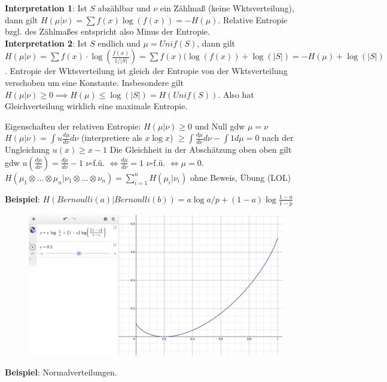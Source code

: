 \begin{outline}
    \1 \textbf{Interpretation 1}: Ist $S$ abzählbar und $\nu$ ein Zählmaß (keine Wktsverteilung), dann gilt $H(\mu|\nu)=\sum f(x)\log(f(x))=-H(\mu)$. Relative Entropie bzgl. des Zählmaßes entspricht also Minus der Entropie. \\

    \1 \textbf{Interpretation 2}: Ist $S$ endlich und $\mu=Unif(S)$, dann gilt $H(\mu|\nu)=\sum f(x) \cdot \log(\frac{f(x)}{1/|S|})=\sum f(x)(\log(f(x))+\log(|S|)=-H(\mu)+\log(|S|)$. Entropie der Wktsverteilung ist gleich der Entropie von der Wktsverteilung verschoben um eine Konstante. Insbesondere gilt $H(\mu |\nu)\geq 0 \implies H(\mu)\leq \log(|S|) = H(Unif(S))$. Also hat Gleichverteilung wirklich eine maximale Entropie. 

\1 Eigenschaften der relativen Entropie:
    \2 $H(\mu |\nu) \geq 0$ und Null gdw $\mu=\nu$
        \3 $H(\mu|\nu)=\int u\frac{d\mu}{d\nu}d\nu$ (interpretiere als $x\log x$) $\geq \int \frac{d\mu}{d\nu}d\nu-\int 1 d \mu = 0$ nach der Ungleichung $u(x)\geq x-1$
        \3 Die Gleichheit in der Abschätzung oben oben gilt gdw $u(\frac{d\mu}{d\nu})=\frac{d\mu}{d\nu}-1$ $\nu$-f.ü. $\iff \frac{d\mu}{d\nu}=1$ $\nu$-f.ü. $\iff \mu=0$.
    \2 $H(\mu_1\otimes\ldots\otimes\mu_n |\nu_1\otimes\ldots\otimes\nu_n)=\sum^n_{i=1}H(\mu_i | \nu_i)$
        \3 ohne Beweis, Übung (LOL)

\0 \textbf{Beispiel}: $H(Bernoulli(a) | Bernoulli(b)) = a \log a/p + (1-a)\log \frac{1-a}{1-p}$
\begin{figure}
    \centering
    \includegraphics[width=1\linewidth]{IMG_1666.jpeg}
\end{figure}

\0 \textbf{Beispiel}: Normalverteilungen.



\end{outline}
